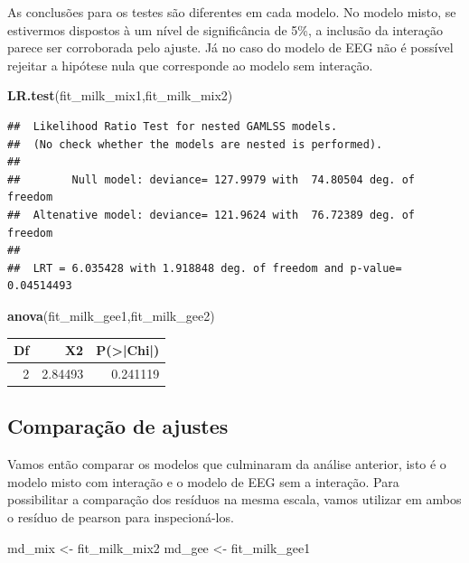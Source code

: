 \documentclass[
  11pt,
]{article}
\newenvironment{Shaded}{\begin{snugshade}}{\end{snugshade}}
\newcommand{\KeywordTok}[1]{\textcolor[rgb]{0.13,0.29,0.53}{\textbf{#1}}}
\newcommand{\NormalTok}[1]{#1}
\newcommand{\StringTok}[1]{\textcolor[rgb]{0.31,0.60,0.02}{#1}}
\begin{document}
As conclusões para os testes são diferentes em cada modelo. No modelo misto, se estivermos dispostos à um nível de significância de 5\%, a inclusão da interação parece ser corroborada pelo ajuste. Já no caso do modelo de EEG não é possível rejeitar a hipótese nula que corresponde ao modelo sem interação.

\begin{Shaded}
\begin{Highlighting}[]
\KeywordTok{LR.test}\NormalTok{(fit_milk_mix1,fit_milk_mix2)}
\end{Highlighting}
\end{Shaded}

\begin{verbatim}
##  Likelihood Ratio Test for nested GAMLSS models. 
##  (No check whether the models are nested is performed). 
##  
##        Null model: deviance= 127.9979 with  74.80504 deg. of freedom 
##  Altenative model: deviance= 121.9624 with  76.72389 deg. of freedom 
##  
##  LRT = 6.035428 with 1.918848 deg. of freedom and p-value= 0.04514493
\end{verbatim}

\begin{Shaded}
\begin{Highlighting}[]
\KeywordTok{anova}\NormalTok{(fit_milk_gee1,fit_milk_gee2)}
\end{Highlighting}
\end{Shaded}

\begin{tabular}{r|r|r}
\hline
Df & X2 & P(>|Chi|)\\
\hline
2 & 2.84493 & 0.241119\\
\hline
\end{tabular}

\hypertarget{comparauxe7uxe3o-de-ajustes}{%
\subsection{Comparação de ajustes}\label{comparauxe7uxe3o-de-ajustes}}

Vamos então comparar os modelos que culminaram da análise anterior, isto é o modelo misto com interação e o modelo de EEG sem a interação. Para possibilitar a comparação dos resíduos na mesma escala, vamos utilizar em ambos o resíduo de pearson para inspecioná-los.

\begin{Shaded}
\begin{Highlighting}[]
\NormalTok{md_mix <-}\StringTok{ }\NormalTok{fit_milk_mix2}
\NormalTok{md_gee <-}\StringTok{ }\NormalTok{fit_milk_gee1}
\end{Highlighting}
\end{Shaded}
\end{document}
